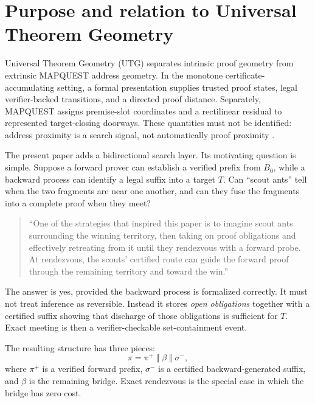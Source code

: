\documentclass[11pt]{article}
\begin{document}
\tableofcontents
\newpage

\section{Purpose and relation to Universal Theorem Geometry}

Universal Theorem Geometry (UTG) separates intrinsic proof geometry from extrinsic MAPQUEST address geometry. In the monotone certificate-accumulating setting, a formal presentation supplies trusted proof states, legal verifier-backed transitions, and a directed proof distance. Separately, MAPQUEST assigns premise-slot coordinates and a rectilinear residual to represented target-closing doorways. These quantities must not be identified: address proximity is a search signal, not automatically proof proximity \cite{UTGI,UTGII,GLC}.

The present paper adds a bidirectional search layer. Its motivating question is simple. Suppose a forward prover can establish a verified prefix from $B_0$, while a backward process can identify a legal suffix into a target $T$. Can ``scout ants'' tell when the two fragments are near one another, and can they fuse the fragments into a complete proof when they meet?

\begin{quote}
``One of the strategies that inspired this paper is to imagine scout ants surrounding the winning territory, then taking on proof obligations and effectively retreating from it until they rendezvous with a forward probe. At rendezvous, the scouts' certified route can guide the forward proof through the remaining territory and toward the win.''
\end{quote}

The answer is yes, provided the backward process is formalized correctly. It must not treat inference as reversible. Instead it stores \emph{open obligations} together with a certified suffix showing that discharge of those obligations is sufficient for $T$. Exact meeting is then a verifier-checkable set-containment event.

The resulting structure has three pieces:
\begin{equation}
\boxed{\pi = \pi^{+}\;\Vert\;\beta\;\Vert\;\sigma^{-}},
\end{equation}
where $\pi^+$ is a verified forward prefix, $\sigma^-$ is a certified backward-generated suffix, and $\beta$ is the remaining bridge. Exact rendezvous is the special case in which the bridge has zero cost.
\end{document}
